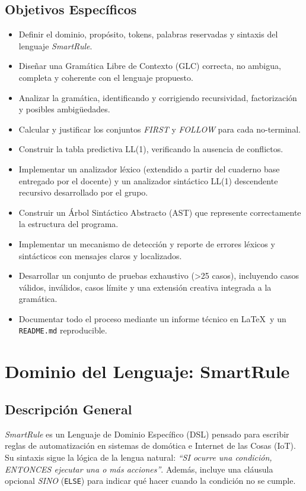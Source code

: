\documentclass[12pt,a4paper]{article}
\begin{document}
\subsection{Objetivos Específicos}
\begin{itemize}[leftmargin=1cm]
    \item Definir el dominio, propósito, tokens, palabras reservadas y sintaxis del lenguaje \textit{SmartRule}.
    \item Diseñar una Gramática Libre de Contexto (GLC) correcta, no ambigua, completa y coherente con el lenguaje propuesto.
    \item Analizar la gramática, identificando y corrigiendo recursividad, factorización y posibles ambigüedades.
    \item Calcular y justificar los conjuntos \textit{FIRST} y \textit{FOLLOW} para cada no-terminal.
    \item Construir la tabla predictiva LL(1), verificando la ausencia de conflictos.
    \item Implementar un analizador léxico (extendido a partir del cuaderno base entregado por el docente) y un analizador sintáctico LL(1) descendente recursivo desarrollado por el grupo.
    \item Construir un Árbol Sintáctico Abstracto (AST) que represente correctamente la estructura del programa.
    \item Implementar un mecanismo de detección y reporte de errores léxicos y sintácticos con mensajes claros y localizados.
    \item Desarrollar un conjunto de pruebas exhaustivo (\textgreater25 casos), incluyendo casos válidos, inválidos, casos límite y una extensión creativa integrada a la gramática.
    \item Documentar todo el proceso mediante un informe técnico en \LaTeX\ y un \texttt{README.md} reproducible.
\end{itemize}

\newpage

\section{Dominio del Lenguaje: SmartRule}

\subsection{Descripción General}
\textit{SmartRule} es un Lenguaje de Dominio Específico (DSL) pensado para escribir reglas de automatización en sistemas de domótica e Internet de las Cosas (IoT). Su sintaxis sigue la lógica de la lengua natural: \textit{``SI ocurre una condición, ENTONCES ejecutar una o más acciones''}. Además, incluye una cláusula opcional \textit{SINO} (\texttt{ELSE}) para indicar qué hacer cuando la condición no se cumple.
\end{document}
